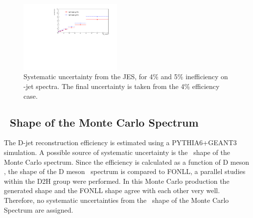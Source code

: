\begin{figure}[bth]
\centering
\includegraphics[width=0.45\textwidth]{pPbcuts_2sig/JES/JES_reg4_unc}
\caption{Systematic uncertainty from the JES, for 4\% and 5\% inefficiency on \Dzero-jet spectra. The final uncertainty is taken from the 4\% efficiency case. }
\label{fig:JESsys_Dzero}
\end{figure}


\subsection{\pt\ Shape of the Monte Carlo Spectrum}

The D-jet reconstruction efficiency is estimated using a PYTHIA6+GEANT3 simulation.
A possible source of systematic uncertainty is the \ptd\ shape of the Monte Carlo spectrum.
Since the efficiency is calculated as a function of D meson , the shape of the D meson \ptd\ spectrum is compared to FONLL, a parallel studies within the D2H group were performed. In this Monte Carlo production the generated shape and the FONLL shape agree with each other very well. Therefore, no systematic uncertainties from the \ptd\ shape of the Monte Carlo Spectrum are assigned.


